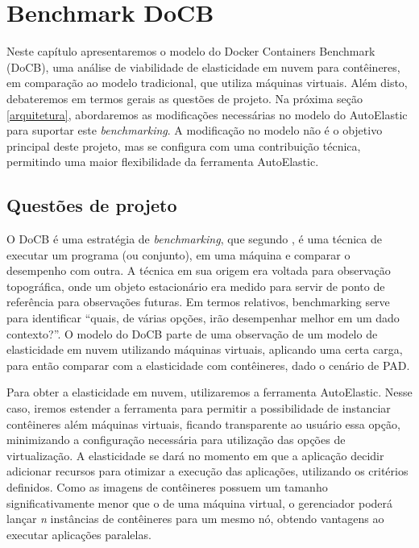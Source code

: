 \documentclass[twoside,english,brazilian]{UNISINOSartigo}
\begin{document}
\section{Benchmark DoCB}
\label{model}

Neste capítulo apresentaremos o modelo do Docker Containers Benchmark (DoCB), uma análise de viabilidade de elasticidade em nuvem para contêineres, em comparação ao modelo tradicional, que utiliza máquinas virtuais. Além disto, debateremos em termos gerais as questões de projeto. Na próxima seção \ref{arquitetura}, abordaremos as modificações necessárias no modelo do AutoElastic para suportar este \textit{benchmarking}. A modificação no modelo não é o objetivo principal deste projeto, mas se configura com uma contribuição técnica, permitindo uma maior flexibilidade da ferramenta AutoElastic. 

\subsection{Questões de projeto}
\label{questao}

O DoCB é uma estratégia de \textit{benchmarking}, que segundo , é uma técnica de executar um programa (ou conjunto), em uma máquina e comparar o desempenho com outra. A técnica em sua origem era voltada para observação topográfica, onde um objeto estacionário era medido para servir de ponto de referência para observações futuras. Em termos relativos, benchmarking serve para identificar ``quais, de várias opções, irão desempenhar melhor em um dado contexto?''. O modelo do DoCB parte de uma observação de um modelo de elasticidade em nuvem utilizando máquinas virtuais, aplicando uma certa carga, para então comparar com a elasticidade com contêineres, dado o cenário de PAD.

Para obter a elasticidade em nuvem, utilizaremos a ferramenta AutoElastic. Nesse caso, iremos estender a ferramenta para permitir a possibilidade de instanciar contêineres além máquinas virtuais, ficando transparente ao usuário essa opção, minimizando a configuração necessária para utilização das opções de virtualização. A elasticidade se dará no momento em que a aplicação decidir adicionar recursos para otimizar a execução das aplicações, utilizando os critérios definidos. Como as imagens de contêineres possuem um tamanho significativamente menor que o de uma máquina virtual, o gerenciador poderá lançar \textit{n} instâncias de contêineres para um mesmo nó, obtendo vantagens ao executar aplicações paralelas. 
\end{document}
